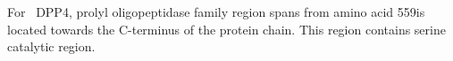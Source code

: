 For~ DPP4, prolyl oligopeptidase family region spans from amino acid 559is located towards the C-terminus of the protein chain. This region contains serine catalytic region.  